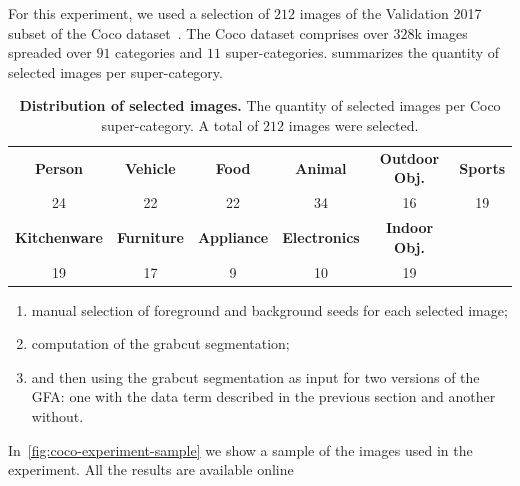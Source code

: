 \documentclass[review]{siamart220329}
\begin{document}
For this experiment, we used a selection of $212$ images of the Validation 2017 subset of the Coco dataset~\cite{lin2014microsoft}. The Coco dataset comprises over $328$k images spreaded over $91$ categories and $11$ super-categories.  summarizes the quantity of selected images per super-category. 
%
%
\begin{table}
\footnotesize
	\caption{\textbf{Distribution of selected images.} The quantity of selected images per Coco super-category. A total of $212$ images were selected.}\label{tab:image-categories-distribution}
\begin{tabular}{cccccc}
\textbf{Person} & \textbf{Vehicle} & \textbf{Food} & \textbf{Animal} & \textbf{Outdoor Obj.} & \textbf{Sports} \\
24 & 22 & 22 & 34 & 16 & 19 \\[1em]
\textbf{Kitchenware} & \textbf{Furniture} & \textbf{Appliance} & \textbf{Electronics} & \textbf{Indoor Obj.} & \\
19 & 17 & 9 & 10 & 19 &
\end{tabular}
\end{table}
%
%
\begin{enumerate}
\item manual selection of foreground and background seeds for each selected image;
\item computation of the grabcut segmentation;
\item and then using the grabcut segmentation as input for two versions of the GFA: one with the data term described in the previous section and another without.
\end{enumerate}

In~\cref{fig:coco-experiment-sample} we show a sample of the images
used in the experiment. All the results are available online 
\end{document}
